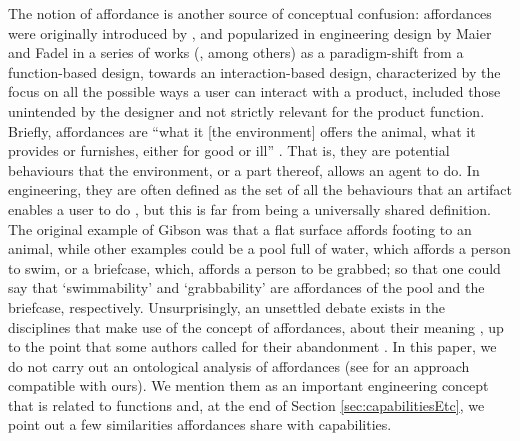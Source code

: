 \documentclass[sw]{iosart2x}
\newcommand{\quotes}[1]{`#1'}
\newcommand{\qquotes}[1]{``#1''}
\newcommand{\TODO}[1]{{%
}}
\newcommand{\myComment}[1]{{\unskip \ignorespaces}}
\begin{document}
The notion of affordance is another source of conceptual confusion:
affordances were originally introduced by \cite{gibsonTheoryAffordances1979}, and popularized in engineering design by Maier and Fadel in a series of works (\cite{maier2001affordance,maierAffordanceBasedDesign2009}, among others) as a paradigm-shift from a function-based design, towards an interaction-based design, characterized by the focus on all the possible ways a user can interact with a product, included those unintended by the designer and not strictly relevant for the product function.
Briefly, affordances are \qquotes{what it [the environment] offers the animal, what it provides or furnishes, either for good or ill} \cite{gibsonTheoryAffordances1979}. That is, they are potential behaviours that the environment, or a part thereof, allows an agent to do. 
In engineering, they are often defined as the set of all the behaviours that an artifact enables a user to do \cite{brownRelationshipFunctionAffordance2005}, but this is far from being a universally shared definition.\myComment{\qquotes{interaction between artifact and user in which properties of the artifact offer a potential use to the user} \cite{maierAffordanceBasedDesign2009}}
The original example of Gibson was that a flat surface affords footing to an animal, while other examples could be a pool full of water, which affords a person to swim, or a briefcase, which, affords a person to be grabbed; so that one could say that \quotes{swimmability} and \quotes{grabbability} are affordances of the pool and the briefcase, respectively.
Unsurprisingly, an unsettled debate exists in the disciplines that make use of the concept of affordances, about their meaning \cite{brownRelationshipFunctionAffordance2005}, up to the point that some authors called for their abandonment \cite{motaDispensingTheoryPhilosophy2021}.
In this paper, we do not carry out an ontological analysis of affordances (see \cite{ortmann2010affordances} for an approach compatible with ours). 
We mention them as an important engineering concept that is related to functions \cite{brownRelationshipFunctionAffordance2005} and, at the end of Section \ref{sec:capabilitiesEtc}, we point out a few similarities affordances share with capabilities.

\end{document}
